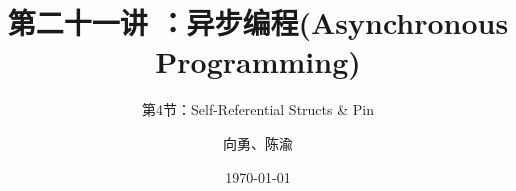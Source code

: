 


\title[第21讲]{第二十一讲 ：异步编程(Asynchronous Programming)} %
\subtitle{第4节：Self-Referential Structs \& Pin}
\author{向勇、陈渝} %
\date{\today} %



\begin{frame}
\titlepage %
\end{frame}


